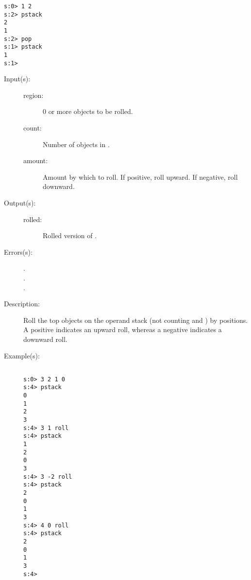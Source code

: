 \begin{description}
\begin{description}
\begin{verbatim}
s:0> 1 2
s:2> pstack
2
1
s:2> pop
s:1> pstack
1
s:1>
		\end{verbatim}
	\end{description}
\label{systemdict:roll}
\item[{\stilop{region count amount}{roll}{rolled}}: ]
	\begin{description}\item[]
	\item[Input(s): ]
		\begin{description}\item[]
		\item[region: ]
			0 or more objects to be rolled.
		\item[count: ]
			Number of objects in .
		\item[amount: ]
			Amount by which to roll.  If positive, roll
			upward.  If negative, roll downward.
		\end{description}
	\item[Output(s): ]
		\begin{description}\item[]
		\item[rolled: ]
			Rolled version of .
		\end{description}
	\item[Errors(s): ]
		\begin{description}\item[]
		\item[.]
		\item[.]
		\item[.]
		\end{description}
	\item[Description: ]
		Roll the top  objects on the operand stack
		(not counting  and ) by
		 positions.  A positive 
		indicates an upward roll, whereas a negative 
		indicates a downward roll.
	\item[Example(s): ]\begin{verbatim}

s:0> 3 2 1 0 
s:4> pstack
0
1
2
3
s:4> 3 1 roll
s:4> pstack
1
2
0
3
s:4> 3 -2 roll
s:4> pstack
2
0
1
3
s:4> 4 0 roll
s:4> pstack
2
0
1
3
s:4>
		\end{verbatim}
	\end{description}
\end{description}

